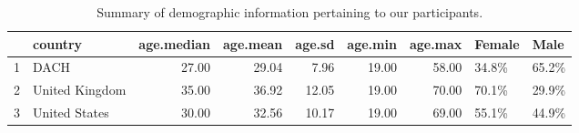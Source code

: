 \begin{table}[ht]
\centering
\begin{tabular}{rlrrrrrll}
  \hline
 & country & age.median & age.mean & age.sd & age.min & age.max & Female & Male \\ 
  \hline
1 & DACH & 27.00 & 29.04 & 7.96 & 19.00 & 58.00 & 34.8\% & 65.2\% \\ 
  2 & United Kingdom & 35.00 & 36.92 & 12.05 & 19.00 & 70.00 & 70.1\% & 29.9\% \\ 
  3 & United States & 30.00 & 32.56 & 10.17 & 19.00 & 69.00 & 55.1\% & 44.9\% \\ 
   \hline
\end{tabular}
\caption{Summary of demographic information pertaining to our participants. } 
\label{demographic_overview_table}
\end{table}
